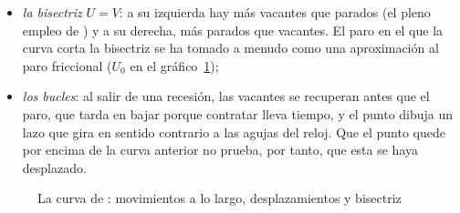 \documentclass[11pt]{article}
\begin{document}
\begin{itemize}
\begin{itemize}
{\begin{itemize}
\item de \emph{actividad agregada}, que mueven el paro y las vacantes en sentido contrario, a lo largo de la curva;
\item de \emph{reasignación}, que los mueven en el mismo sentido y desplazan la curva;
\item de \emph{población activa}, que suben el paro y bajan las vacantes, que se cubren antes.
\end{itemize}}
  \item \emph{la bisectriz} $U=V$: a su izquierda hay más vacantes que parados (el pleno empleo de ) y a su derecha, más parados que vacantes. El paro en el que la curva corta la bisectriz se ha tomado a menudo como una aproximación al paro friccional ($U_0$ en el gráfico~\ref{fig:beveridge});
  \item \emph{los bucles}: al salir de una recesión, las vacantes se recuperan antes que el paro, que tarda en bajar porque contratar lleva tiempo, y el punto dibuja un lazo que gira en sentido contrario a las agujas del reloj. Que el punto quede por encima de la curva anterior no prueba, por tanto, que esta se haya desplazado\nocite{Cahuc2014Labor}.
  \end{itemize}
\end{itemize}

\begin{figure}[H]
\centering
\caption{La curva de : movimientos a lo largo, desplazamientos y bisectriz}\label{fig:beveridge}
\end{figure}
\end{document}
